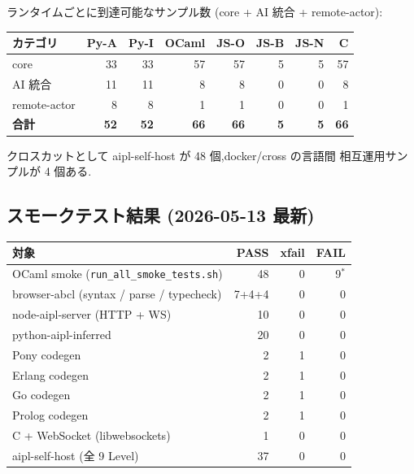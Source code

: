 \documentclass[11pt,a4paper]{article}
\newcommand{\code}[1]{\texttt{\small #1}}
\begin{document}
ランタイムごとに到達可能なサンプル数 (core + AI 統合 + remote-actor):

\begin{tabularx}{\linewidth}{X r r r r r r r}
  \toprule
  カテゴリ & Py-A & Py-I & OCaml & JS-O & JS-B & JS-N & C \\
  \midrule
  core              & 33 & 33 & 57 & 57 & 5 & 5 & 57 \\
  AI 統合           & 11 & 11 & 8  & 8  & 0 & 0 & 8  \\
  remote-actor       & 8  & 8  & 1  & 1  & 0 & 0 & 1  \\
  \midrule
  \textbf{合計}     & \textbf{52} & \textbf{52} & \textbf{66} & \textbf{66} & \textbf{5} & \textbf{5} & \textbf{66} \\
  \bottomrule
\end{tabularx}

クロスカットとして aipl-self-host が 48 個,docker/cross の言語間
相互運用サンプルが 4 個ある.

\subsection{スモークテスト結果 (2026-05-13 最新)}

\begin{tabularx}{\linewidth}{X r r r}
  \toprule
  対象 & PASS & xfail & FAIL \\
  \midrule
  OCaml smoke (\code{run\_all\_smoke\_tests.sh}) & 48 & 0 & 9$^*$ \\
  browser-abcl (syntax / parse / typecheck)       & 7+4+4 & 0 & 0 \\
  node-aipl-server (HTTP + WS)                    & 10 & 0 & 0 \\
  python-aipl-inferred                            & 20 & 0 & 0 \\
  Pony codegen                                    & 2  & 1 & 0 \\
  Erlang codegen                                  & 2  & 1 & 0 \\
  Go codegen                                      & 2  & 1 & 0 \\
  Prolog codegen                                  & 2  & 1 & 0 \\
  C + WebSocket (libwebsockets)                   & 1  & 0 & 0 \\
  aipl-self-host (全 9 Level)                      & 37 & 0 & 0 \\
  \bottomrule
\end{tabularx}
\end{document}
